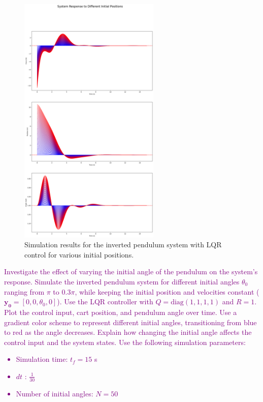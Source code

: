 \documentclass[a4 paper]{article}
\begin{document}
\begin{figure}[H]
    \centering
    \includegraphics[width=0.6\textwidth]{./figs/Different_initial_positions.png}
    \caption{Simulation results for the inverted pendulum system with LQR control for various initial positions.}
\end{figure}


\textcolor{purple}{
 Investigate the effect of varying the initial angle of the pendulum on the system's response. Simulate the inverted pendulum system for different
 initial angles \(\theta_0\) ranging from \( \pi \) to \( 0.3 \pi \), while keeping the initial position and 
 velocities constant (\(\mathbf{y_0} = [0, 0, \theta_0, 0]\)).
  Use the LQR controller with \( Q = \text{diag}(1,1,1,1) \) and \( R = 1 \). Plot the control input, cart position, 
  and pendulum angle over time. Use a gradient color scheme to represent different initial angles, 
  transitioning from blue to red as the angle decreases. Explain how changing the initial angle affects the control input and the system states.
Use the following simulation parameters:
\begin{itemize}
    \item Simulation time: \( t_f = 15 \) s
    \item $dt$ : \( \frac{1}{30} \)
    \item Number of initial angles: \( N = 50 \)
\end{itemize}
}
\end{document}
